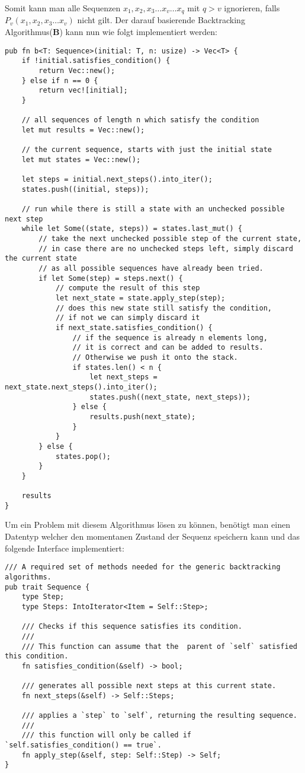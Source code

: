 Somit kann man alle Sequenzen $x_{1}, x_{2}, x_{3} \dots x_{v} \dots x_{q}$ mit $q > v$ ignorieren,
falls $P_{v}(x_{1}, x_{2}, x_{3} \dots x_{v})$ nicht gilt.
Der darauf basierende Backtracking Algorithmus(\textbf{B}) kann nun wie folgt implementiert werden:
\begin{verbatim}
pub fn b<T: Sequence>(initial: T, n: usize) -> Vec<T> {
    if !initial.satisfies_condition() {
        return Vec::new();
    } else if n == 0 {
        return vec![initial];
    }

    // all sequences of length n which satisfy the condition
    let mut results = Vec::new();

    // the current sequence, starts with just the initial state
    let mut states = Vec::new();

    let steps = initial.next_steps().into_iter();
    states.push((initial, steps));

    // run while there is still a state with an unchecked possible next step
    while let Some((state, steps)) = states.last_mut() {
        // take the next unchecked possible step of the current state,
        // in case there are no unchecked steps left, simply discard the current state
        // as all possible sequences have already been tried.
        if let Some(step) = steps.next() {
            // compute the result of this step
            let next_state = state.apply_step(step);
            // does this new state still satisfy the condition,
            // if not we can simply discard it
            if next_state.satisfies_condition() {
                // if the sequence is already n elements long,
                // it is correct and can be added to results.
                // Otherwise we push it onto the stack.
                if states.len() < n {
                    let next_steps = next_state.next_steps().into_iter();
                    states.push((next_state, next_steps));
                } else {
                    results.push(next_state);
                }
            }
        } else {
            states.pop();
        }
    }

    results
}
\end{verbatim}
Um ein Problem mit diesem Algorithmus lösen zu können, benötigt man einen Datentyp welcher den momentanen Zustand
der Sequenz speichern kann und das folgende Interface implementiert:
\begin{verbatim}
/// A required set of methods needed for the generic backtracking algorithms.
pub trait Sequence {
    type Step;
    type Steps: IntoIterator<Item = Self::Step>;

    /// Checks if this sequence satisfies its condition.
    ///
    /// This function can assume that the  parent of `self` satisfied this condition.
    fn satisfies_condition(&self) -> bool;

    /// generates all possible next steps at this current state.
    fn next_steps(&self) -> Self::Steps;

    /// applies a `step` to `self`, returning the resulting sequence.
    ///
    /// this function will only be called if `self.satisfies_condition() == true`.
    fn apply_step(&self, step: Self::Step) -> Self;
}
\end{verbatim}